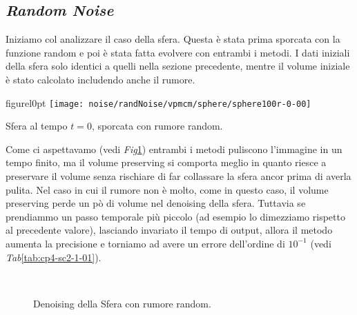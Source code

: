 %
\subsection{\emph{Random Noise}}
Iniziamo col analizzare il caso della sfera. Questa è stata prima
sporcata con la funzione random e poi è stata fatta evolvere con
entrambi i metodi.
I dati iniziali della sfera solo identici a quelli nella sezione
precedente, mentre il volume iniziale è stato calcolato includendo
anche il rumore.

\begin{wrapfloat}{figure}{l}{0pt}
\texttt{[image: noise/randNoise/vpmcm/sphere/sphere100r-0-00]}
\caption{Sfera al tempo $t=0$, sporcata con rumore random.}
\end{wrapfloat}

 Come ci aspettavamo (vedi \emph{Fig}\ref{fig:cp4-sc2-1-01}) entrambi i
metodi puliscono l'immagine in un tempo finito, ma il volume
preserving si comporta meglio in quanto riesce a preservare il volume
senza rischiare di far collassare la sfera ancor prima di averla
pulita. Nel caso in cui il rumore non è molto, come in questo caso, il
volume preserving perde un pò di volume nel denoising della sfera. 
Tuttavia se prendiammo un passo temporale più piccolo (ad esempio lo
dimezziamo rispetto al precedente valore), lasciando invariato il
tempo di output, allora il metodo aumenta la precisione e torniamo ad
avere un errore dell'ordine di $10^{-1}$ (vedi \emph{Tab}\ref{tab:cp4-sc2-1-01}).

\begin{figure}[htb!]
  \centering
  \quad
  \\
  \quad
  \quad
  \caption{Denoising della Sfera con rumore random.}
  \label{fig:cp4-sc2-1-01}
\end{figure}

